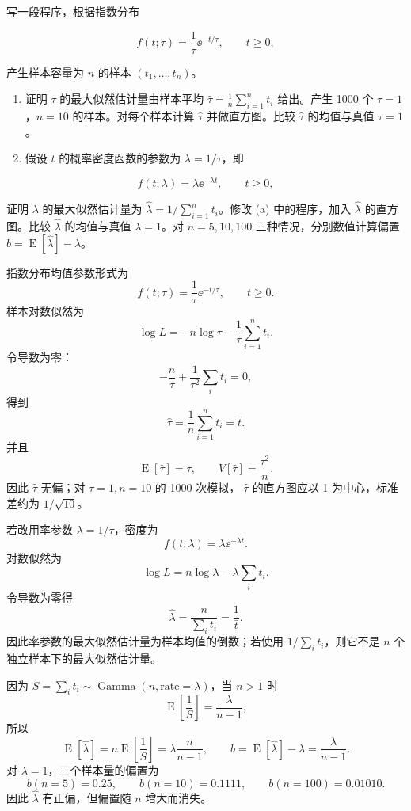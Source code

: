 \begin{question}
写一段程序，根据指数分布

\[
f(t;\tau)=\frac{1}{\tau}\ee^{-t/\tau},\qquad t\ge0,
\]

产生样本容量为 \(n\) 的样本 \((t_1,\ldots,t_n)\)。

\begin{enumerate}
\item
  证明 \(\tau\) 的最大似然估计量由样本平均
  \(\hat\tau=\frac1n\sum_{i=1}^{n}t_i\) 给出。产生 1000 个
  \(\tau=1\)，\(n=10\) 的样本。对每个样本计算 \(\hat\tau\)
  并做直方图。比较 \(\hat\tau\) 的均值与真值 \(\tau=1\)。
\item
  假设 \(t\) 的概率密度函数的参数为 \(\lambda=1/\tau\)，即
\end{enumerate}

\[
f(t;\lambda)=\lambda \ee^{-\lambda t},\qquad t\ge0,
\]

证明 \(\lambda\) 的最大似然估计量为
\(\hat\lambda=1/\sum_{i=1}^{n}t_i\)。修改 (a) 中的程序，加入
\(\hat\lambda\) 的直方图。比较 \(\hat\lambda\) 的均值与真值
\(\lambda=1\)。对 \(n=5,10,100\) 三种情况，分别数值计算偏置
\(b=\operatorname{E}[\hat\lambda]-\lambda\)。
\begin{solution}
指数分布均值参数形式为
\[
f(t;\tau)=\frac1\tau \ee^{-t/\tau},\qquad t\ge0.
\]
样本对数似然为
\[
\log L=-n\log\tau-\frac1\tau\sum_{i=1}^n t_i.
\]
令导数为零：
\[
-\frac n\tau+\frac1{\tau^2}\sum_i t_i=0,
\]
得到
\[
\hat\tau=\frac1n\sum_{i=1}^n t_i=\bar t.
\]
并且
\[
\operatorname{E}[\hat\tau]=\tau,
\qquad
V[\hat\tau]=\frac{\tau^2}{n}.
\]
因此 \(\hat\tau\) 无偏；对 \(\tau=1,n=10\) 的 1000 次模拟，
\(\hat\tau\) 的直方图应以 1 为中心，标准差约为 \(1/\sqrt{10}\)。

若改用率参数 \(\lambda=1/\tau\)，密度为
\[
f(t;\lambda)=\lambda \ee^{-\lambda t}.
\]
对数似然为
\[
\log L=n\log\lambda-\lambda\sum_i t_i.
\]
令导数为零得
\[
\hat\lambda=\frac{n}{\sum_i t_i}=\frac1{\bar t}.
\]
因此率参数的最大似然估计量为样本均值的倒数；若使用 \(1/\sum_i t_i\)，则它不是 \(n\) 个独立样本下的最大似然估计量。

因为 \(S=\sum_i t_i\sim\operatorname{Gamma}(n,\text{rate}=\lambda)\)，当
\(n>1\) 时
\[
\operatorname{E}\left[\frac1S\right]=\frac{\lambda}{n-1},
\]
所以
\[
\operatorname{E}[\hat\lambda]=n\operatorname{E}\left[\frac1S\right]
=\lambda\frac{n}{n-1},
\qquad
b=\operatorname{E}[\hat\lambda]-\lambda=\frac{\lambda}{n-1}.
\]
对 \(\lambda=1\)，三个样本量的偏置为
\[
b(n=5)=0.25,
\qquad
b(n=10)=0.1111,
\qquad
b(n=100)=0.01010.
\]
因此 \(\hat\lambda\) 有正偏，但偏置随 \(n\) 增大而消失。
\end{solution}
\end{question}


